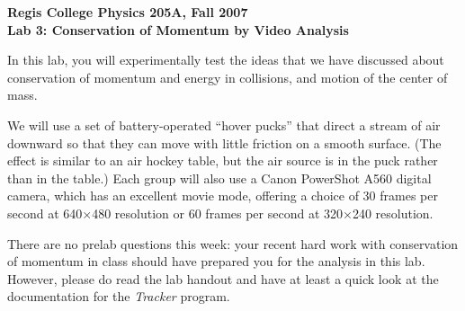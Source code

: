 \documentclass[11pt]{article}
\begin{document}
\begin{center}
{\bf{Regis College Physics 205A, Fall 2007}} \\
{\bf{Lab 3: Conservation of Momentum by Video Analysis}} \\
\end{center}

In this lab, you will experimentally test the ideas that we have discussed
about conservation of momentum and energy in collisions, and motion of the
center of mass.  

We will use a set of battery-operated ``hover pucks'' that direct a stream 
of air downward
so that they can move with little friction on a smooth surface.  (The effect
is similar to an air hockey table, but the air source is in the puck
rather than in the table.)  Each group will also use a Canon PowerShot A560 
digital camera, which has an excellent movie mode, offering a choice of 
30 frames per second at 640$\times$480 resolution or 60 frames per second at 
320$\times$240 resolution.

There are no prelab questions this week: your recent hard work with 
conservation of momentum in class should have prepared you for the
analysis in this lab.  However, please do read the lab handout and have
at least a quick look at the documentation for the {\em{Tracker}} program.

\bigskip
{}
\end{document}
